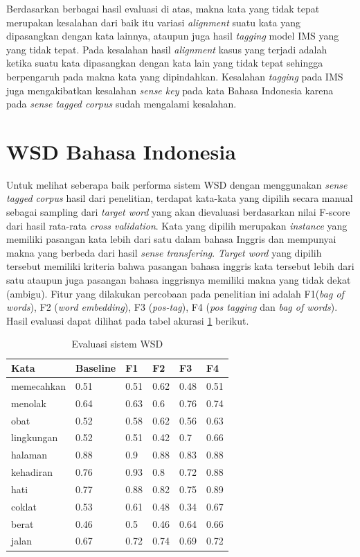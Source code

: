 Berdasarkan berbagai hasil evaluasi di atas, makna kata yang tidak tepat merupakan kesalahan dari baik itu variasi \textit{alignment} suatu kata yang dipasangkan dengan kata lainnya, ataupun juga hasil \textit{tagging} model IMS yang yang tidak tepat. Pada kesalahan hasil \textit{alignment} kasus yang terjadi adalah ketika suatu kata dipasangkan dengan kata lain yang tidak tepat sehingga berpengaruh pada makna kata yang dipindahkan. Kesalahan \textit{tagging} pada IMS juga mengakibatkan kesalahan \textit{sense key} pada kata Bahasa Indonesia karena pada \textit{sense tagged corpus} sudah mengalami kesalahan.
\section{WSD Bahasa Indonesia}

Untuk melihat seberapa baik performa sistem WSD dengan menggunakan \textit{sense tagged corpus} hasil dari penelitian, terdapat kata-kata yang dipilih secara manual sebagai sampling dari \textit{target word} yang akan dievaluasi berdasarkan nilai F-score dari hasil rata-rata \textit{cross validation}. Kata yang dipilih merupakan \textit{instance} yang memiliki pasangan kata lebih dari satu dalam bahasa Inggris dan mempunyai makna yang berbeda dari hasil \textit{sense transfering}. \textit{Target word} yang dipilih tersebut memiliki kriteria bahwa pasangan bahasa inggris kata tersebut lebih dari satu ataupun juga pasangan bahasa inggrisnya memiliki makna yang tidak dekat (ambigu). Fitur yang dilakukan percobaan pada penelitian ini adalah F1(\textit{bag of words}), F2 (\textit{word embedding}), F3 (\textit{pos-tag}), F4 (\textit{pos tagging} dan \textit{bag of words}). Hasil evaluasi dapat dilihat pada tabel akurasi  \ref{table:wsd-evaluation-crawling} berikut.
\begin{table}
	\centering
	\caption{Evaluasi sistem WSD}
	\label{table:wsd-evaluation-crawling}
	\begin{tabular}{|p{3cm}|p{1.5cm}|p{1.5cm}|p{1.5cm}|p{1.5cm}|p{1.5cm}|}
		\hline
		\textbf{Kata} & \textbf{Baseline} & \textbf{F1} & \textbf{F2} & \textbf{F3} & \textbf{F4} \\ \hline
		memecahkan & 0.51 & 0.51 & 0.62 & 0.48 & 0.51 \\ \hline
		menolak & 0.64 & 0.63 & 0.6 & 0.76 & 0.74 \\ \hline
		obat & 0.52 & 0.58 & 0.62 & 0.56 & 0.63 \\ \hline
		lingkungan & 0.52 & 0.51 & 0.42 & 0.7 & 0.66 \\ \hline
		halaman & 0.88 & 0.9 & 0.88 & 0.83 & 0.88 \\ \hline
		kehadiran & 0.76 & 0.93 & 0.8 & 0.72 & 0.88 \\ \hline
		hati & 0.77 & 0.88 & 0.82 & 0.75 & 0.89 \\ \hline
		coklat & 0.53 & 0.61 & 0.48 & 0.34 & 0.67 \\ \hline
		berat & 0.46 & 0.5 & 0.46 & 0.64 & 0.66 \\ \hline
		jalan & 0.67 & 0.72 & 0.74 & 0.69 & 0.72 \\ \hline
	\end{tabular} 
\end{table}


